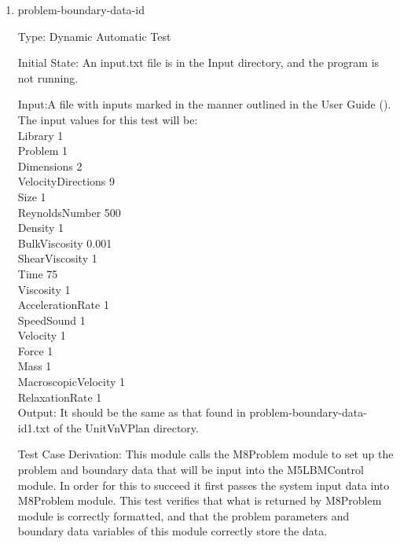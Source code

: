 \documentclass[12pt, titlepage]{article}
\newcounter{uvtestcounter} %
\begin{document}
\begin{enumerate}
	
	\item{problem-boundary-data-id\theuvtestcounter\\}
	
	Type: Dynamic Automatic Test
	
	Initial State: An input.txt file is in the Input directory, and the program is not running.
	
	Input:A file with inputs marked in the manner outlined in the
	User Guide (\citet{LBM_UserGuide_PM}).\\The input values for this test will
	be:\\
	
	Library 1\\
	Problem 1\\
	Dimensions 2\\
	VelocityDirections 9\\
	Size 1\\
	ReynoldsNumber 500\\
	Density 1\\
	BulkViscosity 0.001\\
	ShearViscosity 1\\
	Time 75\\
	Viscosity 1\\
	AccelerationRate 1\\
	SpeedSound 1\\
	Velocity 1\\
	Force 1\\
	Mass 1\\
	MacroscopicVelocity 1\\
	RelaxationRate 1\\
	
	Output: It should be the same as that found in problem-boundary-data-id1.txt of the UnitVnVPlan directory.
	
	Test Case Derivation: This module calls the M8Problem module to set up the problem and boundary data that will be input into the M5LBMControl module. In order for this to succeed it first passes the system input data into M8Problem module. This test verifies that what is returned by M8Problem module is correctly formatted, and that the problem parameters and boundary data variables of this module correctly store the data.
	

\end{enumerate}
\end{document}
